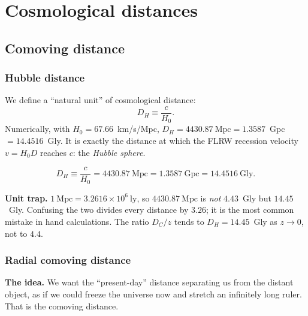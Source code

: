 \documentclass[11pt,a4paper,openany]{report}
\newcommand{\Mpc}{\text{Mpc}}
\newcommand{\ly}{\text{ly}}
\newcommand{\Gly}{\text{Gly}}
\newcommand{\Hzero}{H_{0}}
\newcommand{\eqdef}{\equiv}
\begin{document}
\clearpage

\part{Cosmological distances}

\chapter{Comoving distance}
\label{chap:Dc}

\section{Hubble distance}

\begin{tcolorbox}[undergrad]
We define a “natural unit” of cosmological distance:
\[
D_{H} \eqdef \frac{c}{\Hzero}.
\]
Numerically, with $\Hzero = 67.66$~km/s/Mpc, $D_{H} = \num{4430.87}~\Mpc
= 1.3587$~Gpc $= 14.4516$~Gly. It is exactly the distance at which the FLRW
recession velocity $v = \Hzero D$ reaches $c$: the \emph{Hubble sphere}.
\end{tcolorbox}

\begin{equation}
D_{H} \eqdef \frac{c}{\Hzero} = \num{4430.87}~\Mpc = 1.3587~\text{Gpc}
     = 14.4516~\Gly .
\label{eq:DH}
\end{equation}

\begin{tcolorbox}[warning]
\textbf{Unit trap.} $1~\Mpc = 3.2616\times 10^{6}~\ly$, so $\num{4430.87}~\Mpc$
is \emph{not} $4.43$~Gly but $14.45$~Gly. Confusing the two divides every
distance by $3.26$; it is the most common mistake in hand calculations. The
ratio $D_{C}/z$ tends to $D_{H} = 14.45$~Gly as $z\to 0$, not to $4.4$.
\end{tcolorbox}

\section{Radial comoving distance}

\begin{tcolorbox}[plain]
\textbf{The idea.} We want the “present-day” distance separating us from the
distant object, as if we could freeze the universe now and stretch an
infinitely long ruler. That is the comoving distance.
\end{tcolorbox}
\end{document}
